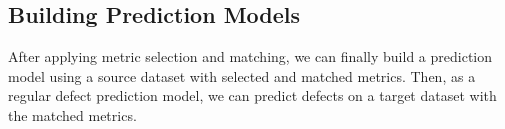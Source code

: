 % 


\subsection{Building Prediction Models}

After applying metric selection and matching, we can finally build a
prediction model using a source dataset with selected and matched metrics. Then,
as a regular defect prediction model, we can predict defects on a target dataset
with the matched metrics.
